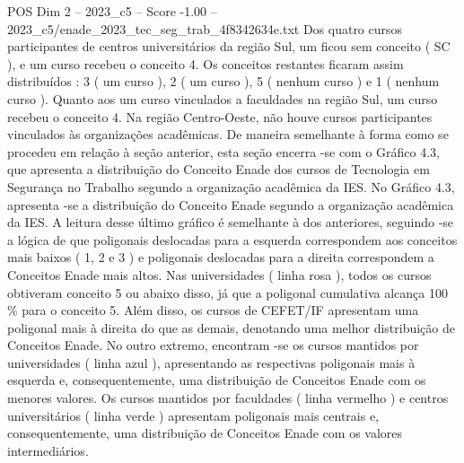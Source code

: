 \begin{textsample}{POS Dim 2 – 2023\_c5 – Score -1.00 – 2023\_c5/enade\_2023\_tec\_seg\_trab\_4f8342634e.txt}
Dos quatro cursos participantes de centros universitários da região Sul, um ficou sem conceito ( SC ), e um curso recebeu o conceito 4.
Os conceitos restantes ficaram assim distribuídos : 3 ( um curso ), 2 ( um curso ), 5 ( nenhum curso ) e 1 ( nenhum curso ).
Quanto aos um curso vinculados a faculdades na região Sul, um curso recebeu o conceito 4.
Na região Centro-Oeste, não houve cursos participantes vinculados às organizações acadêmicas.
De maneira semelhante à forma como se procedeu em relação à seção anterior, esta seção encerra -se com o Gráfico 4.3, que apresenta a distribuição do Conceito Enade dos cursos de Tecnologia em Segurança no Trabalho segundo a organização acadêmica da IES.
No Gráfico 4.3, apresenta -se a distribuição do Conceito Enade segundo a organização acadêmica da IES.
A leitura desse último gráfico é semelhante à dos anteriores, seguindo -se a lógica de que poligonais deslocadas para a esquerda correspondem aos conceitos mais baixos ( 1, 2 e 3 ) e poligonais deslocadas para a direita correspondem a Conceitos Enade mais altos.
Nas universidades ( linha rosa ), todos os cursos obtiveram conceito 5 ou abaixo disso, já que a poligonal cumulativa alcança 100 \% para o conceito 5.
Além disso, os cursos de CEFET/IF apresentam uma poligonal mais à direita do que as demais, denotando uma melhor distribuição de Conceitos Enade.
No outro extremo, encontram -se os cursos mantidos por universidades ( linha azul ), apresentando as respectivas poligonais mais à esquerda e, consequentemente, uma distribuição de Conceitos Enade com os menores valores.
Os cursos mantidos por faculdades ( linha vermelho ) e centros universitários ( linha verde ) apresentam poligonais mais centrais e, consequentemente, uma distribuição de Conceitos Enade com os valores intermediários.

\end{textsample}
